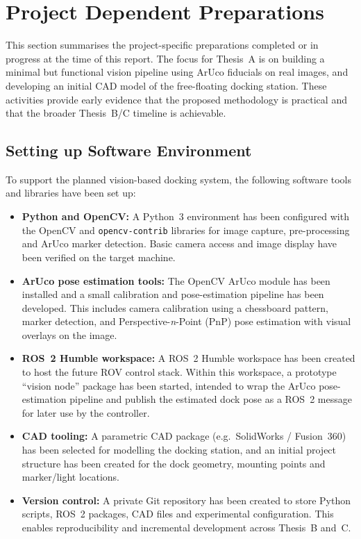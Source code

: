 \section{Project Dependent Preparations} \label{sec:project-prep}

This section summarises the project-specific preparations completed or in progress at the time of this report. The focus for Thesis~A is on building a minimal but functional vision pipeline using ArUco fiducials on real images, and developing an initial CAD model of the free-floating docking station. These activities provide early evidence that the proposed methodology is practical and that the broader Thesis~B/C timeline is achievable.

\subsection{Setting up Software Environment}

To support the planned vision-based docking system, the following software tools and libraries have been set up:

\begin{itemize}
    \item \textbf{Python and OpenCV:} A Python~3 environment has been configured with the OpenCV and \texttt{opencv-contrib} libraries for image capture, pre-processing and ArUco marker detection. Basic camera access and image display have been verified on the target machine.
    \item \textbf{ArUco pose estimation tools:} The OpenCV ArUco module has been installed and a small calibration and pose-estimation pipeline has been developed. This includes camera calibration using a chessboard pattern, marker detection, and Perspective-\emph{n}-Point (PnP) pose estimation with visual overlays on the image.
    \item \textbf{ROS~2 Humble workspace:} A ROS~2 Humble workspace has been created to host the future ROV control stack. Within this workspace, a prototype ``vision node'' package has been started, intended to wrap the ArUco pose-estimation pipeline and publish the estimated dock pose as a ROS~2 message for later use by the controller.
    \item \textbf{CAD tooling:} A parametric CAD package (e.g.\ SolidWorks / Fusion~360) has been selected for modelling the docking station, and an initial project structure has been created for the dock geometry, mounting points and marker/light locations.
    \item \textbf{Version control:} A private Git repository has been created to store Python scripts, ROS~2 packages, CAD files and experimental configuration. This enables reproducibility and incremental development across Thesis~B and~C.
\end{itemize}

